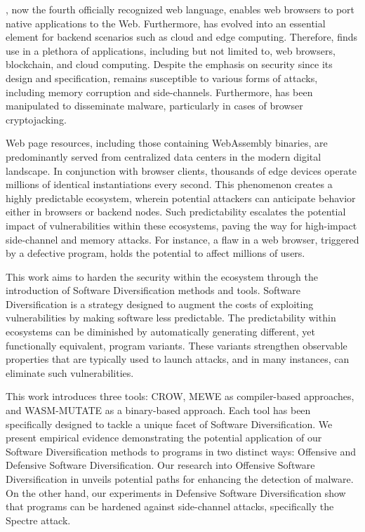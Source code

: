\Wasm, now the fourth officially recognized web language, enables web browsers to port native applications to the Web. 
Furthermore, \Wasm has evolved into an essential element for backend scenarios such as cloud and edge computing. 
Therefore, \Wasm finds use in a plethora of applications, including but not limited to, web browsers, blockchain, and cloud computing. 
Despite the emphasis on security since its design and specification, \Wasm remains susceptible to various forms of attacks, including memory corruption and side-channels. 
Furthermore, \Wasm has been manipulated to disseminate malware, particularly in cases of browser cryptojacking. 

Web page resources, including those containing WebAssembly binaries, are predominantly served from centralized data centers in the modern digital landscape. 
In conjunction with browser clients, thousands of edge devices operate millions of identical \Wasm instantiations every second. 
This phenomenon creates a highly predictable ecosystem, wherein potential attackers can anticipate behavior either in browsers or backend nodes. 
Such predictability escalates the potential impact of vulnerabilities within these ecosystems, paving the way for high-impact side-channel and memory attacks. 
For instance, a flaw in a web browser, triggered by a defective \Wasm program, holds the potential to affect millions of users.


This work aims to harden the security within the \Wasm ecosystem through the introduction of Software Diversification methods and tools. 
Software Diversification is a strategy designed to augment the costs of exploiting vulnerabilities by making software less predictable.
The predictability within ecosystems can be diminished by automatically generating different, yet functionally equivalent, program variants. 
These variants strengthen observable properties that are typically used to launch attacks, and in many instances, can eliminate such vulnerabilities. 


This work introduces three tools: CROW, MEWE as compiler-based approaches, and WASM-MUTATE as a binary-based approach. 
Each tool has been specifically designed to tackle a unique facet of Software Diversification. 
We present empirical evidence demonstrating the potential application of our Software Diversification methods to \Wasm programs in two distinct ways: Offensive and Defensive Software Diversification. 
Our research into Offensive Software Diversification in \Wasm unveils potential paths for enhancing the detection of \Wasm malware. 
On the other hand, our experiments in Defensive Software Diversification show that \Wasm programs can be hardened against side-channel attacks, specifically the Spectre attack.


